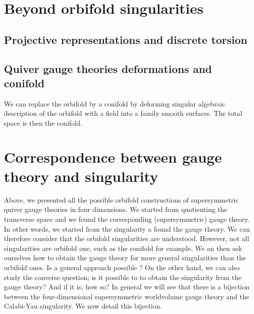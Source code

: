 
\section{Beyond orbifold singularities}

    \subsection{Projective representations and discrete torsion}

    \subsection{Quiver gauge theories deformations and conifold}

        We can replace the orbifold by a conifold by deforming singular algebraic description of the orbifold with a field into a family smooth surfaces. The total space is then the conifold.

\section{Correspondence between gauge theory and singularity}

    Above, we presented all the possible orbifold constructions of supersymmetric quiver gauge theories in four dimensions. We started from quotienting the transverse space and we found the corresponding (supersymmetric) gauge theory. In other words, we started from the singularity a found the gauge theory. We can therefore consider that the orbifold singularities are understood. However, not all singularities are orbifold one, such as the conifold for example. We an then ask ourselves how to obtain the gauge theory for more general singularities than the orbifold ones. Is a general approach possible ? On the other hand, we can also study the converse question; is it possible to to obtain the singularity from the gauge theory? And if it is, how so? In general we will see that there is a bijection between the four-dimensional supersymmetric worldvolume gauge theory and the Calabi-Yau singularity. We now detail this bijection.

